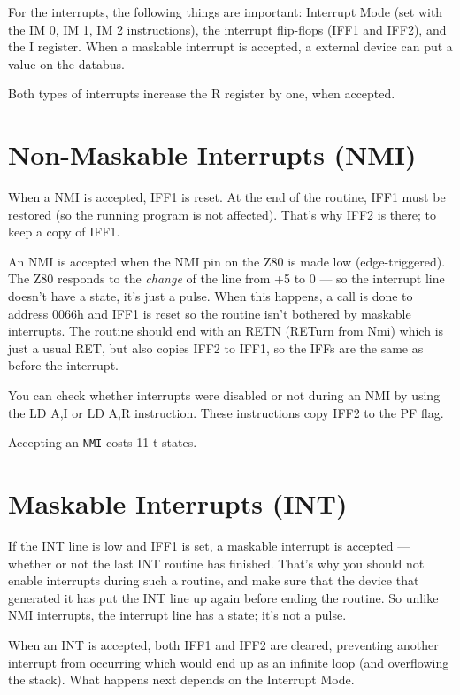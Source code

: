 \documentclass[oneside,a4paper]{book}
\begin{document}
For the interrupts, the following things are important: Interrupt Mode (set with the {\ttfamily IM 0, IM 1, IM 2} instructions), the interrupt flip-flops (IFF1 and IFF2), and the I register. When a maskable interrupt is accepted, a external device can put a value on the databus.

Both types of interrupts increase the R register by one, when accepted.


\section{Non-Maskable Interrupts (NMI)}

When a NMI is accepted, IFF1 is reset. At the end of the routine, IFF1 must be restored (so the running program is not affected). That's why IFF2 is there; to keep a copy of IFF1.

An NMI is accepted when the NMI pin on the Z80 is made low (edge-triggered). The Z80 responds to the {\em change} of the line from +5 to 0 --- so the interrupt line doesn't have a state, it's just a pulse. When this happens, a call is done to address 0066h and IFF1 is reset so the routine isn't bothered by maskable interrupts. The routine should end with an {\ttfamily RETN} (RETurn from Nmi) which is just a usual RET, but also copies IFF2 to IFF1, so the IFFs are the same as before the interrupt.

You can check whether interrupts were disabled or not during an NMI by using the {\ttfamily LD A,I} or {\ttfamily LD A,R} instruction. These instructions copy IFF2 to the PF flag.

Accepting an {\tt NMI} costs 11 t-states.


\section{Maskable Interrupts (INT)}

If the INT line is low and IFF1 is set, a maskable interrupt is accepted --- whether or not the last INT routine has finished. That's why you should not enable interrupts during such a routine, and make sure that the device that generated it has put the INT line up again before ending the routine. So unlike NMI interrupts, the interrupt line has a state; it's not a pulse.

When an INT is accepted, both IFF1 and IFF2 are cleared, preventing another interrupt from occurring which would end up as an infinite loop (and overflowing the stack). What happens next depends on the Interrupt Mode.
\end{document}
